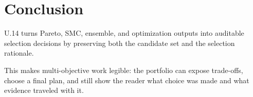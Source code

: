 \section{Conclusion}

U.14 turns Pareto, SMC, ensemble, and optimization outputs into auditable
selection decisions by preserving both the candidate set and the selection
rationale.

This makes multi-objective work legible: the portfolio can expose trade-offs,
choose a final plan, and still show the reader what choice was made and what
evidence traveled with it.
